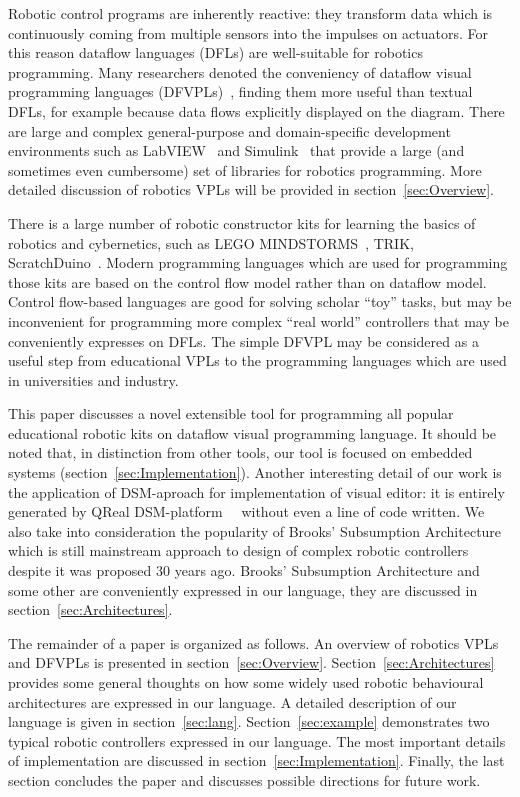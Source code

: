 \documentclass[conference,compsoc]{IEEEtran}
\begin{document}
Robotic control programs are inherently reactive: they transform data which is continuously coming from multiple sensors into the impulses on actuators. For this reason dataflow languages (DFLs) are well-suitable for robotics programming. Many researchers denoted the conveniency of dataflow visual programming languages (DFVPLs)~\cite{johnston2004advances}, finding them more useful than textual DFLs, for example because data flows explicitly displayed on the diagram. There are large and complex general-purpose and domain-specific development environments such as LabVIEW~\cite{labview} and Simulink~\cite{simulink} that provide a large (and sometimes even cumbersome) set of libraries for robotics programming. More detailed discussion of robotics VPLs will be provided in section~\ref{sec:Overview}.

There is a large number of robotic constructor kits for learning the basics of robotics and cybernetics, such as LEGO MINDSTORMS~\cite{legokit}, TRIK, ScratchDuino~\cite{ScratchDuino}. Modern programming languages which are used for programming those kits are based on the control flow model rather than on dataflow model. Control flow-based languages are good for solving scholar ``toy'' tasks, but may be inconvenient for programming more complex ``real world'' controllers that may be conveniently expresses on DFLs. The simple DFVPL may be considered as a useful step from educational VPLs to the programming languages which are used in universities and industry. 

This paper discusses a novel extensible tool for programming all popular educational robotic kits on dataflow visual programming language. It should be noted that, in distinction from other tools, our tool is focused on embedded systems (section~\ref{sec:Implementation}). Another interesting detail of our work is the application of DSM-aproach for implementation of visual editor: it is entirely generated by QReal DSM-platform~\cite{qrealMeta}~\cite{kuzenkova2013qreal} without even a line of code written. We also take into consideration the popularity of Brooks' Subsumption Architecture~\cite{brooks1986robust} which is still mainstream approach to design of complex robotic controllers~\cite{banyasad2000visual,simpson2006mobile,posso2011process,proetzsch2007behaviour} despite it was proposed 30 years ago. Brooks' Subsumption Architecture and some other are conveniently expressed in our language, they are discussed in section~\ref{sec:Architectures}.

The remainder of a paper is organized as follows. An overview of robotics VPLs and DFVPLs is presented in section~\ref{sec:Overview}. Section~\ref{sec:Architectures} provides some general thoughts on how some widely used robotic behavioural architectures are expressed in our language. A detailed description of our language is given in section~\ref{sec:lang}. Section~\ref{sec:example} demonstrates two typical robotic controllers expressed in our language. The most important details of implementation are discussed in section~\ref{sec:Implementation}. Finally, the last section concludes the paper and discusses possible directions for future work.
\end{document}
